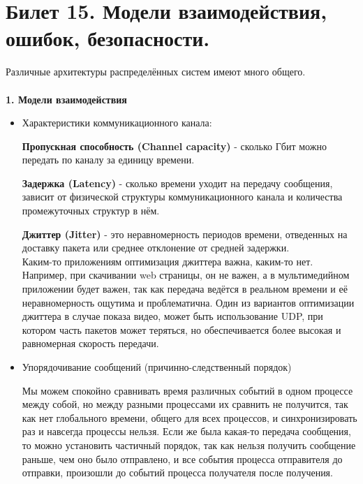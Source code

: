 \newpage
\section {Билет 15. Модели взаимодействия, ошибок, безопасности.}

Различные архитектуры распределённых систем имеют много общего.\\
\\
\textbf{1. Модели взаимодействия}
\begin{itemize}
\item Характеристики коммуникационного канала:

\hspace{-6px}\textbf{Пропускная способность (Channel capacity)} - сколько Гбит можно передать по каналу за единицу времени.

\hspace{-6px}\textbf{Задержка (Latency)} - сколько времени уходит на передачу сообщения, зависит от физической структуры коммуникационного канала и количества промежуточных структур в нём.

\hspace{-6px}\textbf{Джиттер (Jitter)}  - это неравномерность периодов времени, отведенных на доставку пакета или среднее отклонение от средней задержки. \\
Каким-то приложениям оптимизация джиттера важна, каким-то нет. Например, при скачивании web страницы, он не важен, а в мультимедийном приложении будет важен, так как передача ведётся в реальном времени и её неравномерность ощутима и проблематична. Один из вариантов оптимизации джиттера в случае показа видео, может быть использование UDP, при котором часть пакетов может теряться, но обеспечивается более высокая и равномерная скорость передачи.

\item Упорядочивание сообщений (причинно-следственный порядок)

Мы можем спокойно сравнивать время различных событий в одном процессе между собой, но между разными процессами их сравнить не получится, так как нет глобального времени, общего для всех процессов, и синхронизировать раз и навсегда процессы нельзя. Если же была какая-то передача сообщения, то можно установить частичный порядок, так как нельзя получить сообщение раньше, чем оно было отправлено, и все события процесса отправителя до отправки, произошли до событий процесса получателя после получения.

\newpage


\end{itemize}
